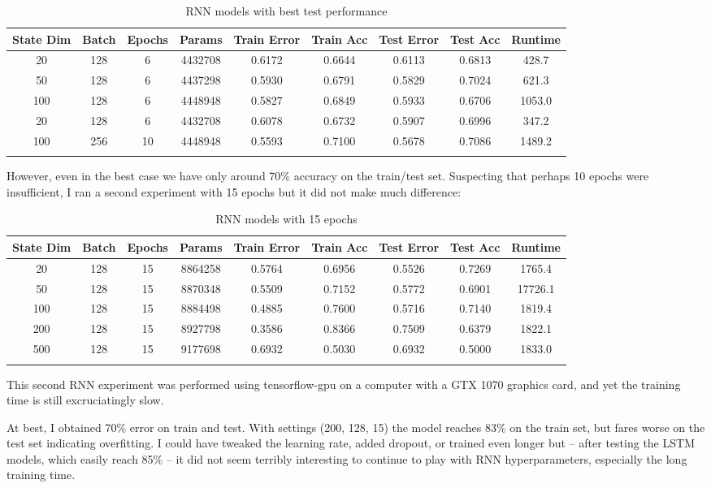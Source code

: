 \documentclass[letterpaper, 10pt]{article}
\begin{document}
\begin{longtable}{c | c | c | c | c | c | c | c | c}
State Dim & Batch & Epochs & Params & Train Error & Train Acc & Test Error & Test Acc & Runtime\\
\hline
\endhead
20 & 128 & 6 & 4432708 & 0.6172 & 0.6644 & 0.6113 & 0.6813 & 428.7 \\
50 & 128 & 6 & 4437298 & 0.5930 & 0.6791 & 0.5829 & 0.7024 & 621.3 \\
100 & 128 & 6 & 4448948 & 0.5827 & 0.6849 & 0.5933 & 0.6706 & 1053.0 \\
20 & 128 & 6 & 4432708 & 0.6078 & 0.6732 & 0.5907 & 0.6996 & 347.2 \\
100 & 256 & 10 & 4448948 & 0.5593 & 0.7100 & 0.5678 & 0.7086 & 1489.2 \\
\caption{RNN models with best test performance}
\end{longtable}

\newpage

However, even in the best case we have only around 70\% accuracy on the train/test set.
Suspecting that perhaps 10 epochs were insufficient, I ran a second experiment
with 15 epochs but it did not make much difference:

\begin{longtable}{c | c | c | c | c | c | c | c | c}
State Dim & Batch & Epochs & Params & Train Error & Train Acc & Test Error & Test Acc & Runtime\\
\hline
\endhead
20 & 128 & 15 & 8864258 & 0.5764 & 0.6956 & 0.5526 & 0.7269 & 1765.4 \\
50 & 128 & 15 & 8870348 & 0.5509 & 0.7152 & 0.5772 & 0.6901 & 17726.1 \\
100 & 128 & 15 & 8884498 & 0.4885 & 0.7600 & 0.5716 & 0.7140 & 1819.4 \\
200 & 128 & 15 & 8927798 & 0.3586 & 0.8366 & 0.7509 & 0.6379 & 1822.1 \\
500 & 128 & 15 & 9177698 & 0.6932 & 0.5030 & 0.6932 & 0.5000 & 1833.0 \\
\caption{RNN models with 15 epochs}
\end{longtable}

This second RNN experiment was performed using tensorflow-gpu on a computer with a GTX 1070
graphics card, and yet the training time is still excruciatingly slow.

At best, I obtained 70\% error on train and test. With settings (200, 128, 15)
the model reaches 83\% on the train set, but fares worse on the test set indicating
 overfitting. I could have tweaked the learning rate, added dropout,
or trained even longer but -- after testing the LSTM models, which easily reach 85\% --
it did not seem terribly interesting to continue to play with RNN hyperparameters,
especially the long training time.
\end{document}
